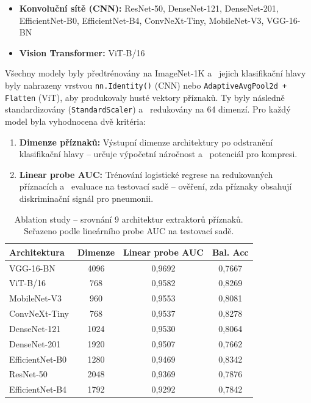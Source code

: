 \documentclass[12pt, a4paper]{report}
\begin{document}
\begin{itemize}
    \item \textbf{Konvoluční sítě (CNN):} ResNet-50, DenseNet-121, DenseNet-201, EfficientNet-B0, EfficientNet-B4, ConvNeXt-Tiny, MobileNet-V3, VGG-16-BN
    \item \textbf{Vision Transformer:} ViT-B/16
\end{itemize}

Všechny modely byly předtrénovány na ImageNet-1K a ~jejich klasifikační hlavy byly nahrazeny vrstvou \texttt{nn.Identity()} (CNN) nebo \texttt{AdaptiveAvgPool2d + Flatten} (ViT), aby produkovaly husté vektory příznaků. Ty byly následně standardizovány (\texttt{StandardScaler}) a ~redukovány na 64 dimenzí. Pro každý model byla vyhodnocena dvě kritéria:

\begin{enumerate}
    \item \textbf{Dimenze příznaků:} Výstupní dimenze architektury po odstranění klasifikační hlavy -- určuje výpočetní náročnost a ~potenciál pro kompresi.
    \item \textbf{Linear probe AUC:} Trénování logistické regrese na redukovaných příznacích a ~evaluace na testovací sadě -- ověření, zda příznaky obsahují diskriminační signál pro pneumonii.
\end{enumerate}

\begin{table}[htbp]
    \centering
    \caption{Ablation study -- srovnání 9 architektur extraktorů příznaků. Seřazeno podle lineárního probe AUC na testovací sadě.}
    \label{tab:backbone_comparison}
    \small
    \renewcommand{\arraystretch}{1.2}
    \begin{tabular}{|l|c|c|c|}
        \hline
        \textbf{Architektura} & \textbf{Dimenze} & \textbf{Linear probe AUC} & \textbf{Bal. Acc} \\
        \hline
        VGG-16-BN        & 4096 & 0,9692 & 0,7667 \\
        ViT-B/16         & 768  & 0,9582 & 0,8269 \\
        MobileNet-V3     & 960  & 0,9553 & 0,8081 \\
        ConvNeXt-Tiny    & 768  & 0,9537 & 0,8278 \\
        DenseNet-121     & 1024 & 0,9530 & 0,8064 \\
        DenseNet-201     & 1920 & 0,9507 & 0,7662 \\
        EfficientNet-B0  & 1280 & 0,9469 & 0,8342 \\
        ResNet-50        & 2048 & 0,9369 & 0,7876 \\
        EfficientNet-B4  & 1792 & 0,9292 & 0,7842 \\
        \hline
    \end{tabular}
\end{table}
\end{document}
